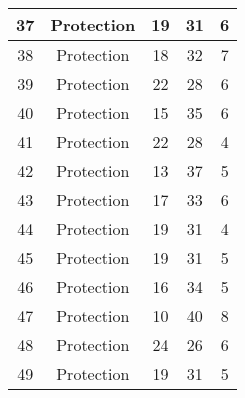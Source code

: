 \documentclass[results.tex]{subfiles}
\begin{document}
\begin{center}
\begin{tabular}{| c || c | c | c | c |}
            \hline
            37                      & Protection                   & 19                     & 31                      & 6                    \\
            \hline
            38                      & Protection                   & 18                     & 32                      & 7                    \\
            \hline
            39                      & Protection                   & 22                     & 28                      & 6                    \\
            \hline
            40                      & Protection                   & 15                     & 35                      & 6                    \\
            \hline
            41                      & Protection                   & 22                     & 28                      & 4                    \\
            \hline
            42                      & Protection                   & 13                     & 37                      & 5                    \\
            \hline
            43                      & Protection                   & 17                     & 33                      & 6                    \\
            \hline
            44                      & Protection                   & 19                     & 31                      & 4                    \\
            \hline
            45                      & Protection                   & 19                     & 31                      & 5                    \\
            \hline
            46                      & Protection                   & 16                     & 34                      & 5                    \\
            \hline
            47                      & Protection                   & 10                     & 40                      & 8                    \\
            \hline
            48                      & Protection                   & 24                     & 26                      & 6                    \\
            \hline
            49                      & Protection                   & 19                     & 31                      & 5                    \\
            \hline
        \end{tabular}
    \end{center}
\end{document}
